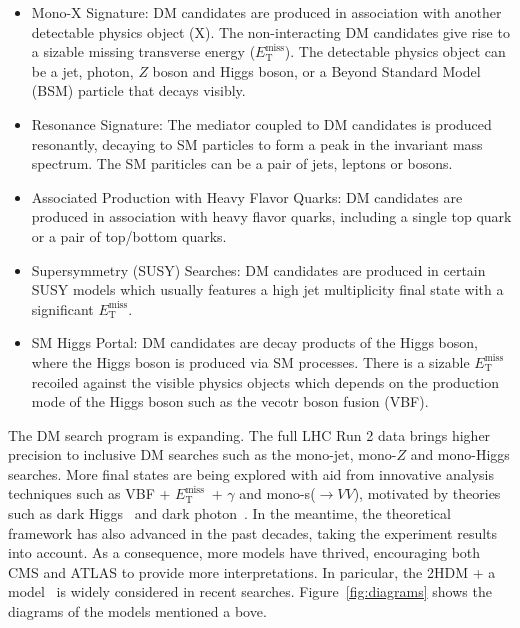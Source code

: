 \documentclass{moriond}
\def\et{E_\textrm{T}^{\textrm{miss}}}
\begin{document}
\begin{itemize}
\item Mono-X Signature: DM candidates are produced in association with another detectable physics object (X). The non-interacting DM candidates give rise to a sizable missing transverse energy ($\et$). The detectable physics object can be a jet, photon, $Z$ boson and Higgs boson, or a Beyond Standard Model (BSM) particle that decays visibly.   
\item Resonance Signature: The mediator coupled to DM candidates is produced resonantly, decaying to SM particles to form a peak in the invariant mass spectrum. The SM pariticles can be a pair of jets, leptons or bosons. 
\item Associated Production with Heavy Flavor Quarks: DM candidates are produced in association with heavy flavor quarks, including a single top quark or a pair of top/bottom quarks. 
\item Supersymmetry (SUSY) Searches: DM candidates are produced in certain SUSY models which usually features a high jet multiplicity final state with a significant $\et$.  
\item SM Higgs Portal: DM candidates are decay products of the Higgs boson, where the Higgs boson is produced via SM processes. There is a sizable $\et$ recoiled against the visible physics objects which depends on the production mode of the Higgs boson such as the vecotr boson fusion (VBF). 
\end{itemize}    

The DM search program is expanding. The full LHC Run 2 data brings higher
precision to inclusive DM searches such as the mono-jet, mono-$Z$ and
mono-Higgs searches. More final states are being explored with aid from
innovative analysis techniques such as VBF + $\et$\ +
$\gamma$ and mono-s($\rightarrow VV$), motivated by theories such as dark
Higgs~\cite{DarkH} and dark photon~\cite{DarkPh}. In the meantime, the
theoretical framework has also advanced in the past decades, taking the
experiment results into account.  As a consequence, more models have thrived,
encouraging both CMS and ATLAS to provide more interpretations. In paricular,
the 2HDM + a model~\cite{2HDM} is widely considered in recent searches.
Figure~\ref{fig:diagrams} shows the diagrams of the models mentioned a bove.
\end{document}
